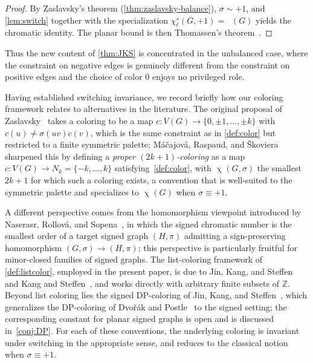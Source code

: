 \documentclass[11pt,a4paper]{article}
\theoremstyle{plain}
\theoremstyle{definition}
\newcommand{\Z}{\mathbb{Z}}
\newcommand{\V}{V}
\DeclareMathOperator{\chia}{\chi}
\DeclareMathOperator{\chil}{\chi_\ell}
\newcommand{\chs}{\chi_{\ell}^{s}}
\newcommand{\Gs}{(G,\sigma)}
\begin{document}
\begin{proof}
By Zaslavsky's theorem (\cref{thm:zaslavsky-balance}),
$\sigma\sim+1$, and \cref{lem:switch} together with the
specialization $\chs(G,+1)=\chil(G)$ yields the chromatic identity.
The planar bound is then Thomassen's
theorem~\cite{Thomassen1994}.
\end{proof}

Thus the new content of \cref{thm:JKS} is concentrated in the
unbalanced case, where the constraint on negative edges is genuinely
different from the constraint on positive edges and the choice of
color $0$ enjoys no privileged role.

Having established switching invariance, we record briefly how our
coloring framework relates to alternatives in the literature. The
original proposal of Zaslavsky~\cite{Zaslavsky1982,Zaslavsky1982a}
takes a coloring to be a map $c:\V(G)\to\{0,\pm1,\dots,\pm k\}$
with $c(u)\ne\sigma(uv)c(v)$, which is the same constraint as in
\cref{def:color} but restricted to a finite symmetric palette;
M\'a\v{c}ajov\'a, Raspaud, and \v{S}koviera~\cite{MRS2016}
sharpened this by defining a \emph{proper $(2k+1)$-coloring} as a
map $c:\V(G)\to N_k=\{-k,\dots,k\}$ satisfying~\cref{def:color},
with $\chia\Gs$ the smallest $2k+1$ for which such a coloring
exists, a convention that is well-suited to the symmetric palette
and specializes to $\chia(G)$ when $\sigma\equiv+1$.

A different perspective comes from the homomorphism viewpoint
introduced by Naserasr, Rollov\'a, and Sopena~\cite{NaserasrRS2015},
in which the signed chromatic number is the smallest order of a
target signed graph $(H,\pi)$ admitting a sign-preserving
homomorphism $\Gs\to(H,\pi)$; this perspective is particularly
fruitful for minor-closed families of signed graphs. The
list-coloring framework of \cref{def:listcolor}, employed in the
present paper, is due to Jin, Kang, and
Steffen~\cite{JinKangSteffen2016} and Kang and
Steffen~\cite{KangSteffen2018}, and works directly with arbitrary
finite subsets of $\Z$. Beyond list coloring lies the signed
DP-coloring of Jin, Kang, and Steffen~\cite{JinKangSteffen2018},
which generalizes the DP-coloring of Dvo\v{r}\'ak and
Postle~\cite{DvorakPostle2018} to the signed setting; the
corresponding constant for planar signed graphs is open and is
discussed in~\cref{conj:DP}. For each of these conventions, the
underlying coloring is invariant under switching in the appropriate
sense, and reduces to the classical notion when $\sigma\equiv+1$.
\end{document}
